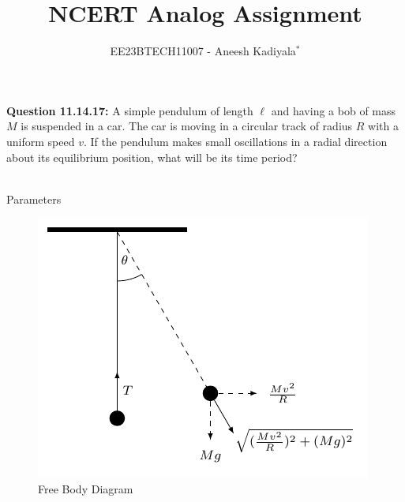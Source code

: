 \documentclass[journal,12pt,twocolumn]{IEEEtran}
\theoremstyle{remark}
\begin{document}

\vspace{3cm}

\title{NCERT Analog Assignment}
\author{EE23BTECH11007 - Aneesh Kadiyala$^{*}$%
}
\maketitle
\newpage
\bigskip

\renewcommand{\thefigure}{\theenumi}
\renewcommand{\thetable}{\theenumi}

\vspace{3cm}
\textbf{Question 11.14.17:} A simple pendulum of length $\ell$ and having a bob of mass $M$ is suspended in a car. The car is moving in a circular track of radius $R$ with a uniform speed $v$. If the pendulum makes small oscillations in a radial direction about its equilibrium position, what will be its time period?
\\
\solution
\\
\begin{table}[h!]
    \centering
    \caption{Parameters}
    \label{tab:1}
    
\end{table}
\begin{figure}[h!]
\centering
\includegraphics{figs/fbd.pdf}
\caption{Free Body Diagram}
\label{fig:analog_11_14_17_1}
\end{figure}
\end{document}
